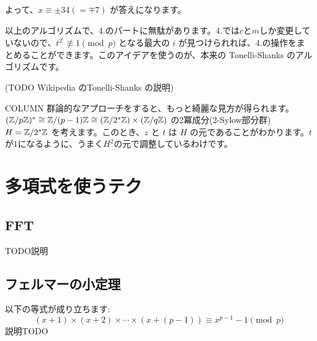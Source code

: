 \documentclass{jsarticle}
\begin{document}
よって、$x \equiv \pm 34 (=\mp 7)$ が答えになります。


以上のアルゴリズムで、4.のパートに無駄があります。4.では$c$と$m$しか変更していないので、$t^{2^i}\not \equiv 1 \pmod p$ となる最大の $i$ が見つけられれば、4.の操作をまとめることができます。このアイデアを使うのが、本来の Tonelli-Shanks のアルゴリズムです。

(TODO Wikipedia のTonelli-Shanks の説明)

\begin{itembox}[l]{COLUMN}
 群論的なアプローチをすると、もっと綺麗な見方が得られます。
$(\mathbb{Z}/p\mathbb{Z})^* \cong \mathbb{Z}/(p-1)\mathbb{Z} \cong (\mathbb{Z}/2^s\mathbb{Z}) \times (\mathbb{Z}/q\mathbb{Z})$ の2冪成分(2-Sylow部分群) $H = \mathbb{Z}/2^s\mathbb{Z}$ を考えます。このとき、$z$ と $t$ は $H$ の元であることがわかります。$t$が$1$になるように、うまく$H^2$の元で調整しているわけです。
\end{itembox}
 \section{多項式を使うテク}
 \label{sec:technique-using-polynomials}
  \subsection{FFT}
  TODO説明
  \subsection{フェルマーの小定理}
  以下の等式が成り立ちます:
  \begin{displaymath}
   (x+1) \times (x+2) \times \cdots \times (x + (p - 1)) \equiv x^{p-1} - 1 \pmod p
  \end{displaymath}
  説明TODO
\end{document}
